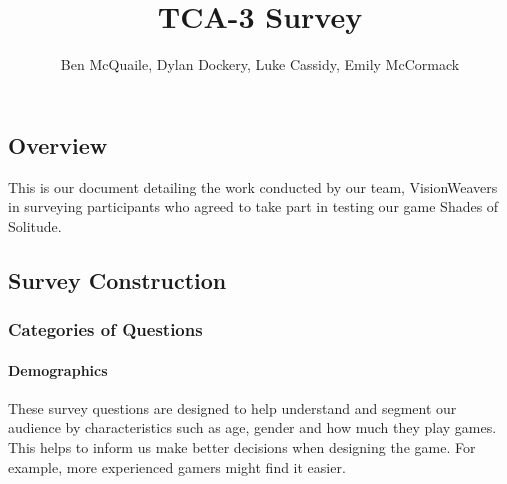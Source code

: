 \documentclass[
  letterpaper,
  DIV=11,
  numbers=noendperiod]{scrartcl}
\title{TCA-3 Survey}
\author{Ben McQuaile, Dylan Dockery, Luke Cassidy, Emily McCormack}
\date{}
\let\oldparagraph\paragraph
\renewcommand{\paragraph}[1]{\oldparagraph{#1}\mbox{}}
\begin{document}
\maketitle

\subsection{Overview}\label{overview}

This is our document detailing the work conducted by our team,
VisionWeavers in surveying participants who agreed to take part in
testing our game Shades of Solitude.

\subsection{Survey Construction}\label{survey-construction}

\subsubsection{Categories of Questions}\label{categories-of-questions}

\paragraph{Demographics}\label{demographics}

These survey questions are designed to help understand and segment our
audience by characteristics such as age, gender and how much they play
games. This helps to inform us make better decisions when designing the
game. For example, more experienced gamers might find it easier.
\end{document}
